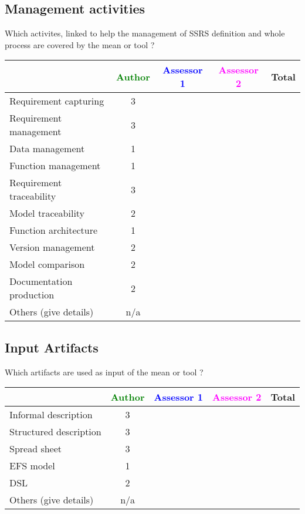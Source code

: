 \subsection{Management activities}

Which activites, linked to help the management of SSRS definition and whole process are covered by the mean or tool  ?

\begin{tabular}{|l | c | c | c | c|}
\hline
& \textcolor{green}{Author} & \textcolor{blue}{Assessor 1} & \textcolor{magenta}{Assessor 2} & Total \\
\hline 
Requirement capturing & 3 & & &  \\
\hline
Requirement management  & 3 & & & \\
\hline
Data management & 1 & & & \\
\hline
Function management & 1 & & & \\
\hline
Requirement traceability  & 3 & & & \\
\hline
Model traceability & 2 & & & \\
\hline
Function architecture & 1 & & & \\
\hline
Version management & 2 & & & \\
\hline
Model comparison & 2 & & & \\
\hline
Documentation production & 2 & & & \\
\hline
Others (give details) & n/a & & & \\
\hline
\end{tabular}

\subsection{Input Artifacts}

Which artifacts are used as input of the mean or tool  ? 


\begin{tabular}{|l | c | c | c | c|}
\hline
& \textcolor{green}{Author} & \textcolor{blue}{Assessor 1} & \textcolor{magenta}{Assessor 2} & Total \\
\hline 
Informal description & 3 & & &  \\
\hline
Structured description & 3 & & & \\
\hline
Spread sheet & 3 & & & \\
\hline
EFS model & 1 & & & \\
\hline
DSL & 2 & & & \\
\hline
Others (give details) & n/a & & & \\
\hline
\end{tabular}

